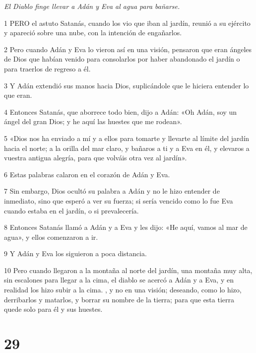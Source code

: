 \par \textit{El Diablo finge llevar a Adán y Eva al agua para bañarse.}

\par 1 PERO el astuto Satanás, cuando los vio que iban al jardín, reunió a su ejército y apareció sobre una nube, con la intención de engañarlos.

\par 2 Pero cuando Adán y Eva lo vieron así en una visión, pensaron que eran ángeles de Dios que habían venido para consolarlos por haber abandonado el jardín o para traerlos de regreso a él.

\par 3 Y Adán extendió sus manos hacia Dios, suplicándole que le hiciera entender lo que eran.

\par 4 Entonces Satanás, que aborrece todo bien, dijo a Adán: «Oh Adán, soy un ángel del gran Dios; y he aquí las huestes que me rodean».

\par 5 «Dios nos ha enviado a mí y a ellos para tomarte y llevarte al límite del jardín hacia el norte; a la orilla del mar claro, y bañaros a ti y a Eva en él, y elevaros a vuestra antigua alegría, para que volváis otra vez al jardín».

\par 6 Estas palabras calaron en el corazón de Adán y Eva.

\par 7 Sin embargo, Dios ocultó su palabra a Adán y no le hizo entender de inmediato, sino que esperó a ver su fuerza; si sería vencido como lo fue Eva cuando estaba en el jardín, o si prevalecería.

\par 8 Entonces Satanás llamó a Adán y a Eva y les dijo: «He aquí, vamos al mar de agua», y ellos comenzaron a ir.

\par 9 Y Adán y Eva los siguieron a poca distancia.

\par 10 Pero cuando llegaron a la montaña al norte del jardín, una montaña muy alta, sin escalones para llegar a la cima, el diablo se acercó a Adán y a Eva, y en realidad los hizo subir a la cima. , y no en una visión; deseando, como lo hizo, derribarlos y matarlos, y borrar su nombre de la tierra; para que esta tierra quede solo para él y sus huestes.



\chapter{29}

